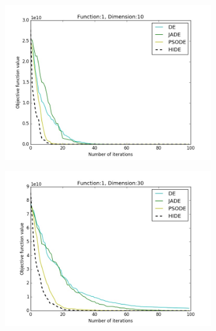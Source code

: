 \documentclass[a4paper,twoside]{article}
\begin{document}
\begin{figure}[h!]
    \centering
    \begin{subfigure}[b]{0.24\textwidth}
        \includegraphics[width=\textwidth,natwidth=800,natheight=600]{plot_10D_F1_save}
        \caption{}
    \end{subfigure}
    \begin{subfigure}[b]{0.24\textwidth}
        \includegraphics[width=\textwidth,natwidth=800,natheight=600]{plot_30D_F1_save}
        \caption{}
    \end{subfigure}    
    \begin{subfigure}[b]{0.24\textwidth}

\end{subfigure}
\end{figure}
\end{document}
